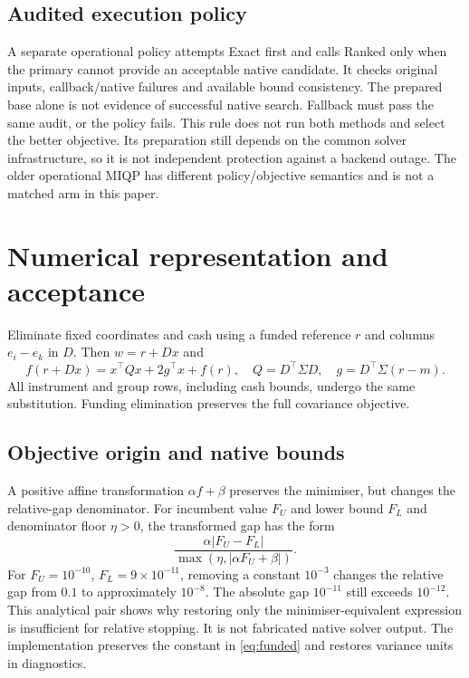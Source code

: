 \documentclass[preprint,12pt,authoryear]{elsarticle}
\begin{document}
\subsection{Audited execution policy}
A separate operational policy attempts Exact first and calls Ranked only when
the primary cannot provide an acceptable native candidate. It checks original
inputs, callback/native failures and available bound consistency. The prepared
base alone is not evidence of successful native search. Fallback must pass the
same audit, or the policy fails. This rule does not run both methods and select
the better objective. Its preparation still depends on the common solver
infrastructure, so it is not independent protection against a backend outage.
The older operational MIQP has different policy/objective semantics and is not
a matched arm in this paper.

\section{Numerical representation and acceptance}\label{sec:numerics}
Eliminate fixed coordinates and cash using a funded reference $r$ and columns
$e_i-e_k$ in $D$. Then $w=r+Dx$ and
\begin{equation}\label{eq:funded}
 f(r+Dx)=x^\top Qx+2g^\top x+f(r),\quad
 Q=D^\top\Sigma D,\quad g=D^\top\Sigma(r-m).
\end{equation}
All instrument and group rows, including cash bounds, undergo the same
substitution. Funding elimination preserves the full covariance objective.

\subsection{Objective origin and native bounds}
A positive affine transformation $\alpha f+\beta$ preserves the minimiser,
but changes the relative-gap denominator. For incumbent value $F_U$ and lower
bound $F_L$ and denominator floor $\eta>0$, the transformed gap has the form
\[
 \frac{\alpha|F_U-F_L|}{\max(\eta,|\alpha F_U+\beta|)}.
\]
For $F_U=10^{-10}$, $F_L=9\times10^{-11}$, removing a constant $10^{-3}$ changes
the relative gap from $0.1$ to approximately $10^{-8}$. The absolute gap
$10^{-11}$ still exceeds $10^{-12}$. This analytical pair shows why restoring
only the minimiser-equivalent expression is insufficient for relative stopping.
It is not fabricated native solver output. The implementation preserves the
constant in \eqref{eq:funded} and restores variance units in diagnostics.
\end{document}
